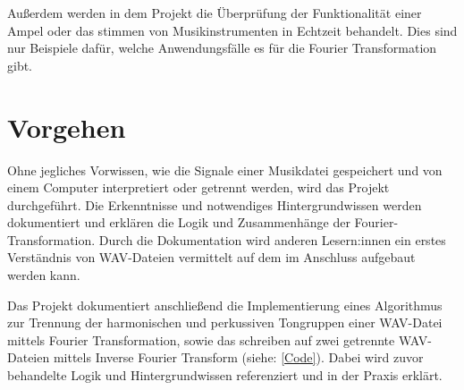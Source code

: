 Außerdem werden in dem Projekt die Überprüfung der Funktionalität einer Ampel oder das stimmen von Musikinstrumenten in Echtzeit behandelt. Dies sind nur Beispiele dafür, welche Anwendungsfälle es für die Fourier Transformation gibt.

%
\section{Vorgehen}
%

Ohne jegliches Vorwissen, wie die Signale einer Musikdatei gespeichert und von einem Computer interpretiert oder getrennt werden, wird das Projekt durchgeführt. Die Erkenntnisse und notwendiges Hintergrundwissen werden dokumentiert und erklären die Logik und Zusammenhänge der Fourier-Transformation. Durch die Dokumentation wird anderen Lesern:innen ein erstes Verständnis von WAV-Dateien vermittelt auf dem im Anschluss aufgebaut werden kann.

\par

Das Projekt dokumentiert anschließend die Implementierung eines Algorithmus zur Trennung der harmonischen und perkussiven Tongruppen einer WAV-Datei mittels Fourier Transformation, sowie das schreiben auf zwei getrennte WAV-Dateien mittels Inverse Fourier Transform (siehe: \cref{Code}). Dabei wird zuvor behandelte Logik und Hintergrundwissen referenziert und in der Praxis erklärt.
